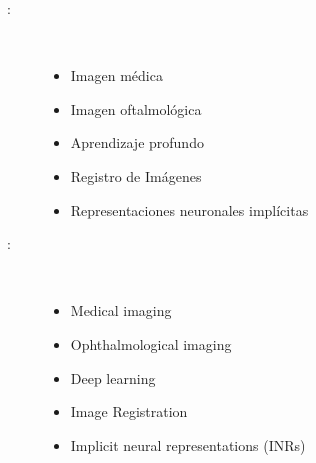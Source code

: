 \begin{multicols}{2}
  \begin{description}
  \item [\palabraschaveprincipal:] \mbox{} \\[-20pt]
  \begin{itemize}
      \item Imagen médica
      \item Imagen oftalmológica
      \item Aprendizaje profundo
      \item Registro de Imágenes 
      \item Representaciones neuronales implícitas
  \end{itemize}
  
  \end{description}
  \begin{description}
  \item [\palabraschavesecundaria:] \mbox{} \\[-20pt]
  \begin{itemize}
      \item Medical imaging
      \item Ophthalmological imaging
      \item Deep learning
      \item Image Registration
      \item Implicit neural representations (INRs)
  \end{itemize}
  \end{description}
  \end{multicols}